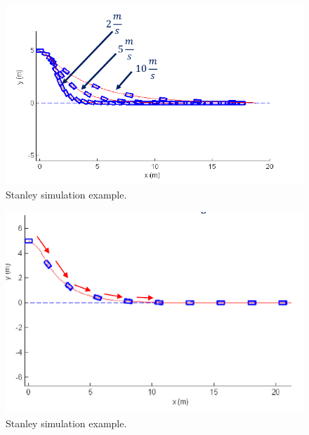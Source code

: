 \begin{figure}[!htb]
\begin{center}
\includegraphics[scale=0.280]{img/lateral_control/stanley_control_4.jpeg}
\end{center}
\caption{Stanley simulation example.}
\label{stanley_control_4}
\end{figure}
\begin{figure}[!htb]
\begin{center}
\includegraphics[scale=0.280]{img/lateral_control/stanley_control_5.jpeg}
\end{center}
\caption{Stanley simulation example.}
\label{stanley_control_5}
\end{figure}

